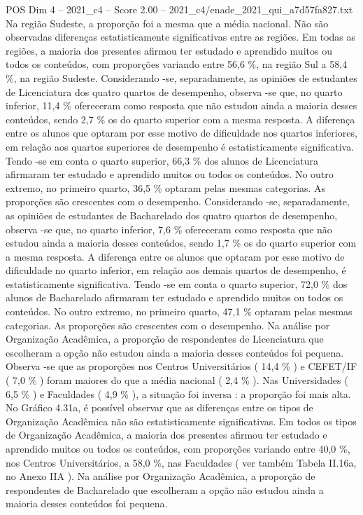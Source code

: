 \begin{textsample}{POS Dim 4 – 2021\_c4 – Score 2.00 – 2021\_c4/enade\_2021\_qui\_a7d57fa827.txt}
Na região Sudeste, a proporção foi a mesma que a média nacional.
Não são observadas diferenças estatisticamente significativas entre as regiões.
Em todas as regiões, a maioria dos presentes afirmou ter estudado e aprendido muitos ou todos os conteúdos, com proporções variando entre 56,6 \%, na região Sul a 58,4 \%, na região Sudeste.
Considerando -se, separadamente, as opiniões de estudantes de Licenciatura dos quatro quartos de desempenho, observa -se que, no quarto inferior, 11,4 \% ofereceram como resposta que não estudou ainda a maioria desses conteúdos, sendo 2,7 \% os do quarto superior com a mesma resposta.
A diferença entre os alunos que optaram por esse motivo de dificuldade nos quartos inferiores, em relação aos quartos superiores de desempenho é estatisticamente significativa.
Tendo -se em conta o quarto superior, 66,3 \% dos alunos de Licenciatura afirmaram ter estudado e aprendido muitos ou todos os conteúdos.
No outro extremo, no primeiro quarto, 36,5 \% optaram pelas mesmas categorias.
As proporções são crescentes com o desempenho.
Considerando -se, separadamente, as opiniões de estudantes de Bacharelado dos quatro quartos de desempenho, observa -se que, no quarto inferior, 7,6 \% ofereceram como resposta que não estudou ainda a maioria desses conteúdos, sendo 1,7 \% os do quarto superior com a mesma resposta.
A diferença entre os alunos que optaram por esse motivo de dificuldade no quarto inferior, em relação aos demais quartos de desempenho, é estatisticamente significativa.
Tendo -se em conta o quarto superior, 72,0 \% dos alunos de Bacharelado afirmaram ter estudado e aprendido muitos ou todos os conteúdos.
No outro extremo, no primeiro quarto, 47,1 \% optaram pelas mesmas categorias.
As proporções são crescentes com o desempenho.
Na análise por Organização Acadêmica, a proporção de respondentes de Licenciatura que escolheram a opção não estudou ainda a maioria desses conteúdos foi pequena.
Observa -se que as proporções nos Centros Universitários ( 14,4 \% ) e CEFET/IF ( 7,0 \% ) foram maiores do que a média nacional ( 2,4 \% ).
Nas Universidades ( 6,5 \% ) e Faculdades ( 4,9 \% ), a situação foi inversa : a proporção foi mais alta.
No Gráfico 4.31a, é possível observar que as diferenças entre os tipos de Organização Acadêmica não são estatisticamente significativas.
Em todos os tipos de Organização Acadêmica, a maioria dos presentes afirmou ter estudado e aprendido muitos ou todos os conteúdos, com proporções variando entre 40,0 \%, nos Centros Universitários, a 58,0 \%, nas Faculdades ( ver também Tabela II.16a, no Anexo IIA ).
Na análise por Organização Acadêmica, a proporção de respondentes de Bacharelado que escolheram a opção não estudou ainda a maioria desses conteúdos foi pequena.

\end{textsample}
